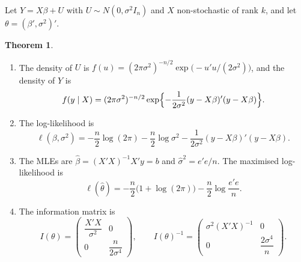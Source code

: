 \documentclass[11pt,a4paper]{article}
\numberwithin{equation}{section}
\theoremstyle{definition}
\newtheorem{thm}{Theorem}[subsection]
\begin{document}
Let $Y = X\beta + U$ with $U \sim N(0, \sigma^2I_n)$ and $X$ non-stochastic of rank $k$, and let $\theta = (\beta', \sigma^2)'$.

\begin{thm}
\label{thm:mllm}
\begin{enumerate}[label=(\roman*)]
\item The density of $U$ is $f(u) = (2\pi\sigma^2)^{-n/2}\exp\bigl(-u'u/(2\sigma^2)\bigr)$, and the density of $Y$ is
\[
f(y \mid X) = (2\pi\sigma^2)^{-n/2}\exp\Bigl\{-\frac{1}{2\sigma^2}(y - X\beta)'(y - X\beta)\Bigr\} .
\]
\item The log-likelihood is
\[
\ell(\beta, \sigma^2) = -\frac n2\log(2\pi) - \frac n2\log\sigma^2 - \frac{1}{2\sigma^2}(y - X\beta)'(y - X\beta) .
\]
\item The MLEs are $\hat\beta = (X'X)^{-1}X'y = b$ and $\hat\sigma^2 = e'e/n$. The maximised log-likelihood is
\[
\ell(\hat\theta) = -\frac n2\bigl(1 + \log(2\pi)\bigr) - \frac n2\log\frac{e'e}{n} .
\]
\item The information matrix is
\[
I(\theta) = \begin{pmatrix} \dfrac{X'X}{\sigma^2} & 0 \\[8pt] 0 & \dfrac{n}{2\sigma^4} \end{pmatrix}, \qquad
I(\theta)^{-1} = \begin{pmatrix} \sigma^2(X'X)^{-1} & 0 \\[2pt] 0 & \dfrac{2\sigma^4}{n} \end{pmatrix} .
\]
\end{enumerate}
\end{thm}
\end{document}
